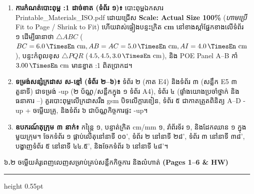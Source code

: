 \documentclass[a4paper,12pt]{article}
\newcommand{\en}[1]{{\TimesEn #1}}
\newcommand{\enbf}[1]{{\TimesEn\textbf{#1}}}
\newcommand{\unit}[1]{\,\text{\en{#1}}}
\newcommand{\cnum}[1]{{\TimesEn\fontsize{10.5pt}{12pt}\selectfont\ding{\numexpr181+#1\relax}}}
\newcommand{\tri}[1]{\ensuremath{\triangle #1}}
\newcommand{\subsectitle}[1]{{\muol\fontsize{11pt}{14.5pt}\selectfont #1}}
\newcommand{\subsec}[1]{%
  \Needspace{1.6cm}%
  \vspace{3pt}%
  \subsectitle{#1}\par%
  \vspace{-2pt}%
  {\color{black}\hrule height 0.55pt}%
  \vspace{3pt}%
}
\begin{document}
\begin{enumerate}[leftmargin=0.65cm, itemsep=2.5pt]
  \item \textbf{ការកំណត់បោះពុម្ព \en{1:1} ដាច់ខាត (ទំព័រ ១)៖} បោះពុម្ពឯកសារ \en{Printable\_Materials\_ISO.pdf} ដោយជ្រើស \textbf{\en{Scale: Actual Size 100\%}} (\emph{ហាមប្រើ} \en{Fit to Page / Shrink to Fit}) ហើយវាស់ផ្ទៀងបន្ទះក្រិត \textbf{\en{5.0 cm}} នៅខាងស្ដាំផ្នែកខាងលើទំព័រ ១ ដើម្បីធានាថា $\tri{ABC}$ ($BC=6.0\unit{cm}, AB=AC=5.0\unit{cm}, AI=4.0\unit{cm}$), បន្ទះកំពូលខុស $\tri{PQR}$ ($4.5, 4.5, 3.0\unit{cm}$), និង \en{POE Panel A--B} កាំ $3.00\unit{cm}$ មានខ្នាត \en{1:1} ពិតប្រាកដ។
  \item \textbf{ទម្រង់សន្សំក្រដាស ស-ខ្មៅ (ទំព័រ ២--៦)៖} ទំព័រ ២ (កាត \en{E4}) និងទំព័រ ៣ (សន្លឹក \en{E5} ៣ តួនាទី) ជាទម្រង់ \en{2-up} (២ ប័ណ្ណ/សន្លឹកក្នុង ១ ទំព័រ \en{A4}), ទំព័រ ៤ (ផ្ទាំងយោងប្រចាំថ្នាក់ និងធនាគារ \cnum{1}--\cnum{5}) គួរបោះពុម្ពលើក្រដាសរឹង \en{180 gsm} បិទលើក្ដារខៀន, ទំព័រ ៥ ជាកាតត្រួតពិនិត្យ \en{A--D} \en{4-up} + ចម្លើយគ្រូ, និងទំព័រ ៦ ជាប័ណ្ណកិច្ចការផ្ទះ \en{4-up}។
  \item \textbf{ឧបករណ៍តុក្រុម ៣ នាក់៖} កន្ត្រៃ ១, បន្ទាត់ក្រិត \en{cm/mm} ១, រ៉ាព័រទ័រ ១, និងដែកឈាន ១ ក្នុងមួយក្រុម។ ចែកទំព័រ ១ ផ្កាប់លើតុនៅនាទី ០០', ទំព័រ ២ នៅនាទី ២៨', ទំព័រ ៣ នៅនាទី ៣៨', បង្ហាញទំព័រ ៥ នៅនាទី ៤៤.៥', និងចែកទំព័រ ៦ នៅនាទី ៤៨'។
\end{enumerate}

\subsec{៦\enbf{.}២ ចម្លើយគំរូពេញលេញសម្រាប់គ្រប់សន្លឹកកិច្ចការ និងលំហាត់ \enbf{(Pages 1--6 \& HW)}}
\end{document}
